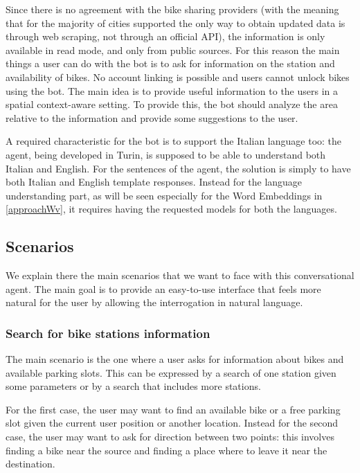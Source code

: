 Since there is no agreement with the bike sharing providers (with the meaning that for the majority of cities supported the only way to obtain updated data is through web scraping, not through an official API), the information is only available in read mode, and only from public sources. For this reason the main things a user can do with the bot is to ask for information on the station and availability of bikes. No account linking is possible and users cannot unlock bikes using the bot. The main idea is to provide useful information to the users in a spatial context-aware setting. To provide this, the bot should analyze the area relative to the information and provide some suggestions to the user.

A required characteristic for the bot is to support the Italian language too: the agent, being developed in Turin, is supposed to be able to understand both Italian and English. For the sentences of the agent, the solution is simply to have both Italian and English template responses. Instead for the language understanding part, as will be seen especially for the Word Embeddings in \ref{approachWv}, it requires having the requested models for both the languages.

\subsection{Scenarios}
\label{approachScenarios}

We explain there the main scenarios that we want to face with this conversational agent. The main goal is to provide an easy-to-use interface that feels more natural for the user by allowing the interrogation in natural language.

\subsubsection{Search for bike stations information}
The main scenario is the one where a user asks for information about bikes and available parking slots. This can be expressed by a search of one station given some parameters or by a search that includes more stations.

For the first case, the user may want to find an available bike or a free parking slot given the current user position or another location. Instead for the second case, the user may want to ask for direction between two points: this involves finding a bike near the source and finding a place where to leave it near the destination.

